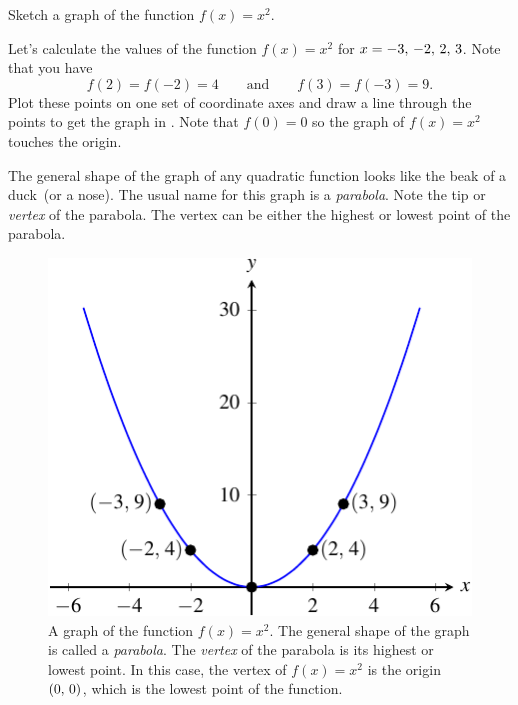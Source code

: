 \documentclass[a4paper,oneside,12pt]{article}
\begin{document}
\begin{example}
Sketch a graph of the function $f(x) = x^2$.
\end{example}

\begin{solution}
Let's calculate the values of the function $f(x) = x^2$ for
$x = {-3},\, {-2},\, {2},\, {3}$.  Note that you have
\[
f(2) = f(-2) = 4
\qquad
\text{and}
\qquad
f(3) = f(-3) = 9.
\]
Plot these points on one set of coordinate axes and draw a line
through the points to get the graph in .
Note that $f(0) = 0$ so the graph of $f(x) = x^2$ touches the origin.
\end{solution}

The general shape of the graph of any quadratic function looks like
the beak of a duck~(or a nose).  The usual name for this graph is a
\emph{parabola}.  Note the tip or \emph{vertex} of the parabola.  The
vertex can be either the highest or lowest point of the parabola.

\begin{figure}[!htbp]
\centering
\includegraphics[scale=1.2]{image/08/a-1.pdf}
\caption{%
  A graph of the function $f(x) = x^2$.  The general shape of the
  graph is called a \emph{parabola}.  The \emph{vertex} of the
  parabola is its highest or lowest point.  In this case, the vertex
  of $f(x) = x^2$ is the origin $\left\lparen{0},\, {0}\right\rparen$, which is the lowest
  point of the function.
}
\label{fig:quadratic_a_1}
\end{figure}
\end{document}

